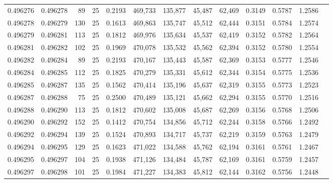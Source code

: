 \begin{tabular}{rrrrrrrrrrrrr}
0.496276 & 0.496278 &    89 &  25 &                                     0.2193 & 469,733 & 135,877 &  45,487 &  62,469 & 0.3149 & 0.5787 & 1.2586 \\
0.496278 & 0.496279 &   130 &  25 &                                     0.1613 & 469,863 & 135,747 &  45,512 &  62,444 & 0.3151 & 0.5784 & 1.2574 \\
0.496279 & 0.496281 &   113 &  25 &                                     0.1812 & 469,976 & 135,634 &  45,537 &  62,419 & 0.3152 & 0.5782 & 1.2564 \\
0.496281 & 0.496282 &   102 &  25 &                                     0.1969 & 470,078 & 135,532 &  45,562 &  62,394 & 0.3152 & 0.5780 & 1.2554 \\
0.496282 & 0.496284 &    89 &  25 &                                     0.2193 & 470,167 & 135,443 &  45,587 &  62,369 & 0.3153 & 0.5777 & 1.2546 \\
0.496284 & 0.496285 &   112 &  25 &                                     0.1825 & 470,279 & 135,331 &  45,612 &  62,344 & 0.3154 & 0.5775 & 1.2536 \\
0.496285 & 0.496287 &   135 &  25 &                                     0.1562 & 470,414 & 135,196 &  45,637 &  62,319 & 0.3155 & 0.5773 & 1.2523 \\
0.496287 & 0.496288 &    75 &  25 &                                     0.2500 & 470,489 & 135,121 &  45,662 &  62,294 & 0.3155 & 0.5770 & 1.2516 \\
0.496288 & 0.496290 &   113 &  25 &                                     0.1812 & 470,602 & 135,008 &  45,687 &  62,269 & 0.3156 & 0.5768 & 1.2506 \\
0.496290 & 0.496292 &   152 &  25 &                                     0.1412 & 470,754 & 134,856 &  45,712 &  62,244 & 0.3158 & 0.5766 & 1.2492 \\
0.496292 & 0.496294 &   139 &  25 &                                     0.1524 & 470,893 & 134,717 &  45,737 &  62,219 & 0.3159 & 0.5763 & 1.2479 \\
0.496294 & 0.496295 &   129 &  25 &                                     0.1623 & 471,022 & 134,588 &  45,762 &  62,194 & 0.3161 & 0.5761 & 1.2467 \\
0.496295 & 0.496297 &   104 &  25 &                                     0.1938 & 471,126 & 134,484 &  45,787 &  62,169 & 0.3161 & 0.5759 & 1.2457 \\
0.496297 & 0.496298 &   101 &  25 &                                     0.1984 & 471,227 & 134,383 &  45,812 &  62,144 & 0.3162 & 0.5756 & 1.2448 \\

\end{tabular}
